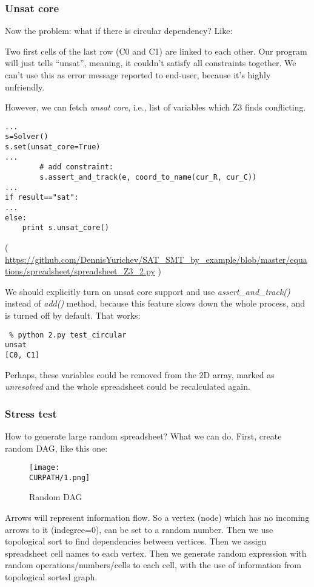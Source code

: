 \subsubsection{Unsat core}

Now the problem: what if there is circular dependency? Like:



Two first cells of the last row (C0 and C1) are linked to each other.
Our program will just tells ``unsat'', meaning, it couldn't satisfy all constraints together.
We can't use this as error message reported to end-user, because it's highly unfriendly.

However, we can fetch \textit{unsat core}, i.e., list of variables which Z3 finds conflicting.

\begin{lstlisting}
...
s=Solver()
s.set(unsat_core=True)
...
        # add constraint:
        s.assert_and_track(e, coord_to_name(cur_R, cur_C))
...
if result=="sat":
...
else:
    print s.unsat_core()
\end{lstlisting}

( \url{https://github.com/DennisYurichev/SAT_SMT_by_example/blob/master/equations/spreadsheet/spreadsheet_Z3_2.py} )

We should explicitly turn on unsat core support and use \textit{assert\_and\_track()} instead of \textit{add()} method,
because this feature slows down the whole process, and is turned off by default.
That works:

\begin{lstlisting}
 % python 2.py test_circular
unsat
[C0, C1]
\end{lstlisting}

Perhaps, these variables could be removed from the 2D array, marked as \textit{unresolved}
and the whole spreadsheet could be recalculated again.

\subsubsection{Stress test}

How to generate large random spreadsheet?
What we can do.
First, create random \ac{DAG}, like this one:

\begin{figure}[H]
\centering
\texttt{[image: \\CURPATH/1.png]}
\caption{Random \ac{DAG}}
\end{figure}

Arrows will represent information flow.
So a vertex (node) which has no incoming arrows to it (indegree=0), can be set to a random number.
Then we use topological sort to find dependencies between vertices.
Then we assign spreadsheet cell names to each vertex.
Then we generate random expression with random operations/numbers/cells to each cell,
with the use of information from topological sorted graph.

